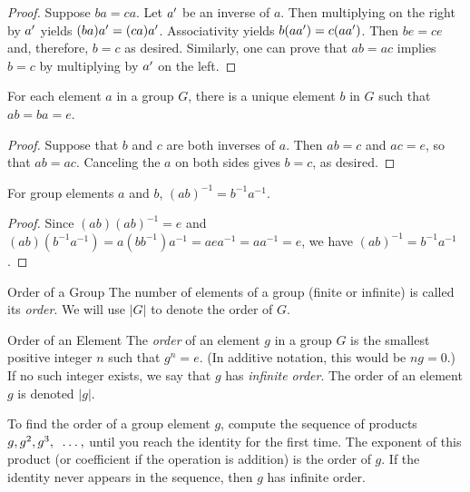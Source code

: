 \documentclass[../butidigress.tex]{subfiles}
\begin{document}
\begin{proof}
Suppose $ba = ca$.
Let ${a}^{\prime}$ be an inverse of $a$.
Then multiplying on the right by ${a}^{\prime}$ yields $(ba){a}^{\prime} = (ca){a}^{\prime}$.
Associativity yields $b(a{a}^{\prime}) = c(a{a}^{\prime})$.
Then $be = ce$ and, therefore, $b = c$ as desired.
Similarly, one can prove that $ab = ac$ implies $b = c$ by multiplying by ${a}^{\prime}$ on the left.
\end{proof}

\begin{theorem}
For each element $a$ in a group $G$, there is a unique element $b$ in $G$ such that $ab=ba=e$.
\end{theorem}

\begin{proof}
Suppose that $b$ and $c$ are both inverses of $a$.
Then $ab = c$ and $ac = e$, so that $ab = ac$.
Canceling the $a$ on both sides gives $b = c$, as desired.
\end{proof}

\begin{theorem}
For group elements $a$ and $b$, $(ab)^{-1} = b^{-1}a^{-1}$.
\end{theorem}

\begin{proof}
Since $(ab)(ab)^{-1} = e$ and $(ab)(b^{-1}a^{-1}) = a(bb^{-1})a^{-1} = aea^{-1} = aa^{-1} = e$, we have $(ab)^{-1} = b^{-1}a^{-1}$.
\end{proof}


\begin{definition}{Order of a Group}
The number of elements of a group (finite or infinite) is called its \emph{order}.
We will use $|G|$ to denote the order of $G$.
\end{definition}

\begin{definition}{Order of an Element}
The \emph{order} of an element $g$ in a group $G$ is the smallest positive integer $n$ such that $g^{n} = e$.
(In additive notation, this would be $ng = 0$.)
If no such integer exists, we say that $g$ has \emph{infinite order}.
The order of an element $g$ is denoted $|g|$.
\end{definition}

To find the order of a group element $g$, compute the sequence of products $g, g^{2}, g^{3},~\kern0.2em.\kern0.2em.\kern0.2em.\kern0.2em,$ until you reach the identity for the first time.
The exponent of this product (or coefficient if the operation is addition) is the order of $g$.
If the identity never appears in the sequence, then $g$ has infinite order.
\end{document}
